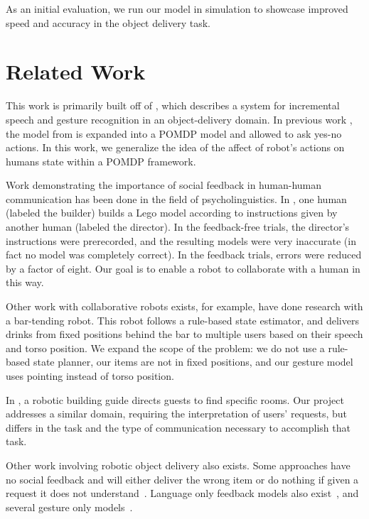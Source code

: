 \documentclass{article}
\begin{document}
\begin{multicols}{2}
As an initial evaluation, we run our model in simulation to showcase improved speed and accuracy in the object delivery task. 


\section{Related Work}

This work is primarily built off of \cite{eldon15thesis}, which describes a system for incremental speech and gesture recognition in an object-delivery domain. In previous work \citep{socialfeedback}, the model from \cite{eldon15thesis} is expanded into a POMDP model and allowed to ask yes-no actions. In this work, we generalize the idea of the affect of robot's actions on humans state within a POMDP framework. 

Work demonstrating the importance of social feedback in human-human
communication has been done in the field of psycholinguistics. In  \cite{clark04}, one human (labeled the builder)
builds a Lego model according to instructions given by another human
(labeled the director). In the feedback-free trials, the director's
instructions were prerecorded, and the resulting models were very
inaccurate (in fact no model was completely correct). In the feedback
trials, errors were reduced by a factor of eight. Our goal is to
enable a robot to collaborate with a human in this way.


Other work with collaborative robots exists, for example, \cite{foster12} have done research with a bar-tending robot. This robot follows a rule-based state estimator, and delivers drinks from fixed positions behind the bar to multiple users based on their speech and torso position. 
We expand the scope of the problem: we do not use a rule-based state planner, our items are not in fixed positions, and our gesture model uses pointing instead of torso position. 

In \cite{bohus14},  a robotic building guide directs guests to find specific rooms. Our project addresses a similar domain, requiring the interpretation of users' requests, but differs in the task and the type of communication necessary to accomplish that task. 

Other work involving robotic object delivery also exists. Some approaches have no social feedback and will either deliver the wrong item or do nothing if given a
request it does not understand~\citep{tellex11,matuszek12,tellex12,misra14}. Language only feedback models also 
exist~\citep{chai14,macmahon06,tellex11,matuszek12,guadarrama14,hewlett11,misra14}, and several gesture only models~\citep{waldherr00,marge11}.



\end{multicols}
\end{document}
